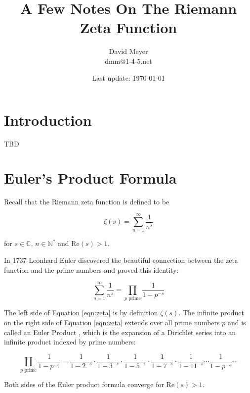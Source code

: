 \documentclass[11pt, oneside]{article}   	%
\title{A Few Notes On The Riemann Zeta Function}
\author{David Meyer \\ dmm@1-4-5.net}
\date{Last update: \today}							%
\theoremstyle{definition}
\begin{document}
\maketitle

\section{Introduction}
TBD

\section{Euler's Product Formula}
Recall that the Riemann zeta function is defined to be

\medskip
\begin{equation*}
\zeta(s) = \sum^\infty_{n = 1} \frac{1}{n^s}
\end{equation*}

\noindent
for $s \in \mathbb{C}$, $n \in \mathbb{N}^*$ and $\text{Re}(s) > 1$.

\bigskip
\noindent
In 1737 Leonhard Euler \cite{euler_product_formula} discovered the beautiful connection between the zeta function and the prime numbers and proved this identity:

\medskip
\begin{equation}
\sum^\infty_{n = 1} \frac{1}{n^s} = \prod_{\text{$p$ prime}} \!  \frac{1}{1 - p^{-s}}
\label{eqn:zeta}
\end{equation}

\bigskip
\noindent
The left side of Equation \ref{eqn:zeta} is by definition $\zeta(s)$. The infinite product on the right side of Equation \ref{eqn:zeta}  extends over all prime numbers $p$ and is called an Euler 
Product \cite{euler_product}, which is the expansion of a Dirichlet series \cite{mccarthy2018} into an infinite product indexed by prime numbers:

\begin{equation*}
\prod_{\text{$p$ prime}} \!  \frac{1}{1 - p^{-s}} = \frac{1}{1 - 2^{-s}} \cdot \frac{1}{1 - 3^{-s}} \cdot  \frac{1}{1 - 5^{-s}} \cdot  \frac{1}{1 - 7^{-s}} \cdot  \frac{1}{1 - 11^{-s}} \cdots  \frac{1}{1 - p^{-s}} \cdots
\end{equation*}

\bigskip
\noindent
Both sides of the Euler product formula converge for $\text{Re}(s) > 1$.




\end{document}
